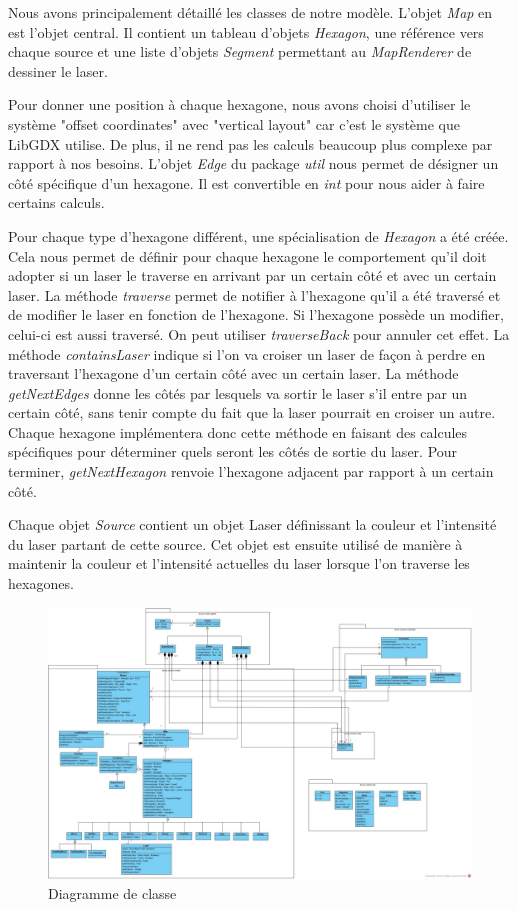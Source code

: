 \documentclass[]{article}
\begin{document}
Nous avons principalement détaillé les classes de notre modèle. L'objet \emph{Map} en est l'objet central. Il contient un tableau d'objets \emph{Hexagon}, une référence vers chaque source et une liste d'objets \emph{Segment} permettant au \emph{MapRenderer} de dessiner le laser.

Pour donner une position à chaque hexagone, nous avons choisi d'utiliser le système "offset coordinates" avec "vertical layout" car c'est le système que LibGDX utilise. De plus, il ne rend pas les calculs beaucoup plus complexe par rapport à nos besoins.
L'objet \emph{Edge} du package \emph{util} nous permet de désigner un côté spécifique d'un hexagone. Il est convertible en \emph{int} pour nous aider à faire certains calculs.

Pour chaque type d'hexagone différent, une spécialisation de \emph{Hexagon} a été créée. Cela nous permet de définir pour chaque hexagone le comportement qu'il doit adopter si un laser le traverse en arrivant par un certain côté et avec un certain laser. La méthode \emph{traverse} permet de notifier à l'hexagone qu'il a été traversé et de modifier le laser en fonction de l'hexagone. Si l'hexagone possède un modifier, celui-ci est aussi traversé. On peut utiliser \emph{traverseBack} pour annuler cet effet. La méthode \emph{containsLaser} indique si l'on va croiser un laser de façon à perdre en traversant l'hexagone d'un certain côté avec un certain laser. La méthode \emph{getNextEdges} donne les côtés par lesquels va sortir le laser s'il entre par un certain côté, sans tenir compte du fait que la laser pourrait en croiser un autre. Chaque hexagone implémentera donc cette méthode en faisant des calcules spécifiques pour déterminer quels seront les côtés de sortie du laser. Pour terminer, \emph{getNextHexagon} renvoie l'hexagone adjacent par rapport à un certain côté.

Chaque objet \emph{Source} contient un objet Laser définissant la couleur et l'intensité du laser partant de cette source. Cet objet est ensuite utilisé de manière à maintenir la couleur et l'intensité actuelles du laser lorsque l'on traverse les hexagones.

\begin{figure}[H]
\begin{center}
  \includegraphics[width=\textwidth]{Class1.jpg}
  \caption{Diagramme de classe}\label{fig:auto}
\end{center}
\end{figure}
\end{document}
